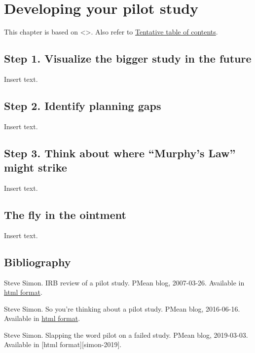 \documentclass[
  letterpaper,
  DIV=11,
  numbers=noendperiod]{scrreprt}
\begin{document}
\chapter{Developing your pilot study}\label{developing-your-pilot-study}

This chapter is based on \textless{}\textgreater. Also refer to
\href{http://www.pmean.com/10/Contents.html}{Tentative table of
contents}.

\section{Step 1. Visualize the bigger study in the
future}\label{step-1.-visualize-the-bigger-study-in-the-future}

Insert text.

\section{Step 2. Identify planning
gaps}\label{step-2.-identify-planning-gaps}

Insert text.

\section{Step 3. Think about where ``Murphy's Law'' might
strike}\label{step-3.-think-about-where-murphys-law-might-strike}

Insert text.

\section{The fly in the ointment}\label{the-fly-in-the-ointment-2}

Insert text.

\section{Bibliography}\label{bibliography-1}

Steve Simon. IRB review of a pilot study. PMean blog, 2007-03-26.
Available in \href{http://www.new.pmean.com/irb-review-pilot/}{html
format}.

Steve Simon. So you're thinking about a pilot study. PMean blog,
2016-06-16. Available in \href{http://blog.pmean.com/pilot-study/}{html
format}.

Steve Simon. Slapping the word pilot on a failed study. PMean blog,
2019-03-03. Available in {[}html format{]}{[}simon-2019{]}.
\end{document}

